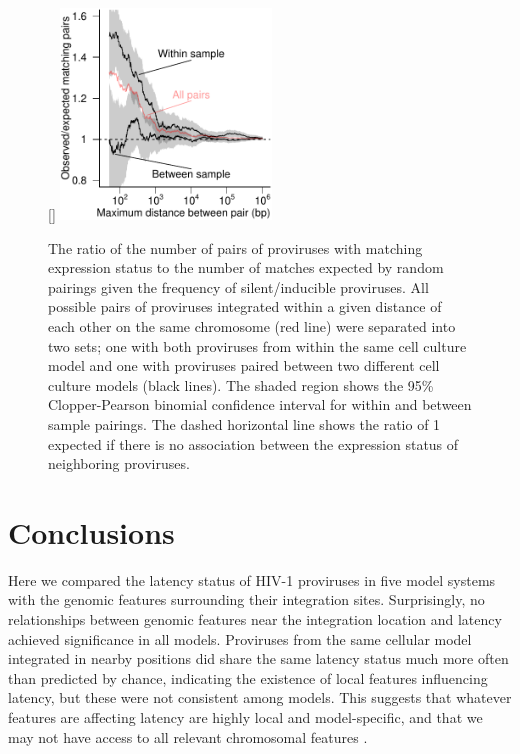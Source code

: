 \documentclass[../sherrill-Mix_thesis.tex]{subfiles}
\begin{document}
	\begin{figure}
		\centering
			[\FBwidth]{
				\includegraphics[width=0.5\textwidth]{neighborMatch.pdf} %
			}{
				\caption[Shared expression status between near neighbors]{The ratio of the number of pairs of proviruses with matching expression status to the number of matches expected by random pairings given the frequency of silent/inducible proviruses. All possible pairs of proviruses integrated within a given distance of each other on the same chromosome (red line) were separated into two sets; one with both proviruses from within the same cell culture model and one with proviruses paired between two different cell culture models (black lines).  The shaded region shows the 95\% Clopper-Pearson binomial confidence interval for within and between sample pairings. The dashed horizontal line shows the ratio of 1 expected if there is no association between the expression status of neighboring proviruses.}
			\label{neighbor}
			}
	\end{figure}


\section{Conclusions}
	Here we compared the latency status of HIV-1 proviruses in five model systems with the genomic features surrounding their integration sites. Surprisingly, no relationships between genomic features near the integration location and latency achieved significance in all models. Proviruses from the same cellular model integrated in nearby positions did share the same latency status much more often than predicted by chance, indicating the existence of local features influencing latency, but these were not consistent among models. This suggests that whatever features are affecting latency are highly local and model-specific, and that we may not have access to all relevant chromosomal features \citep[e.g.\ ][]{Lassen2006, Dieudonne2009,Siliciano2011,Lusic2013}. %
\end{document}
